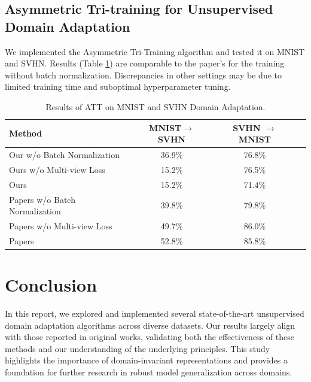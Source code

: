 \documentclass{article}
\begin{document}
\subsection{Asymmetric Tri-training for Unsupervised Domain Adaptation}
We implemented the Asymmetric Tri-Training algorithm and tested it on MNIST and SVHN. Results (Table \ref{tab:att_results}) are comparable to the paper's for the training without batch normalization. Discrepancies in other settings may be due to limited training time and suboptimal hyperparameter tuning.
\begin{table}
  \centering
  \caption{Results of ATT on MNIST and SVHN Domain Adaptation.}
  \label{tab:att_results}
  \begin{tabular}{lccc}
      \toprule
      \textbf{Method} & \textbf{MNIST\(\to\)SVHN} & \textbf{SVHN \(\to\) MNIST} \\
      \midrule
      Our w/o Batch Normalization & 36.9\% & 76.8\% \\
      Ours w/o Multi-view Loss & 15.2\% & 76.5\% \\
      Ours  & 15.2\% & 71.4\% \\
      \midrule
      Papers w/o Batch Normalization & 39.8\% & 79.8\% \\
      Papers w/o Multi-view Loss & 49.7\% & 86.0\% \\
      Papers  & 52.8\% & 85.8\% \\
      \bottomrule
  \end{tabular}
\end{table}








\section{Conclusion}
In this report, we explored and implemented several state-of-the-art unsupervised domain adaptation algorithms across diverse datasets. Our results largely align with those reported in original works, validating both the effectiveness of these methods and our understanding of the underlying principles. This study highlights the importance of domain-invariant representations and provides a foundation for further research in robust model generalization across domains.
\end{document}
